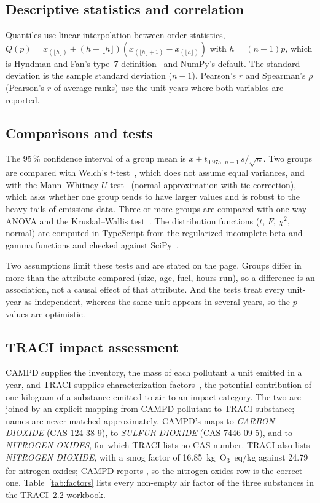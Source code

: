 \documentclass[11pt,a4paper]{article}
\begin{document}
\subsection{Descriptive statistics and correlation}

Quantiles use linear interpolation between order statistics, $Q(p) = x_{(\lfloor h\rfloor)} +
(h - \lfloor h\rfloor)(x_{(\lfloor h\rfloor + 1)} - x_{(\lfloor h\rfloor)})$ with $h = (n-1)p$,
which is Hyndman and Fan's type~7 definition~\cite{hyndman1996quantiles} and NumPy's default.
The standard deviation is the sample standard deviation ($n - 1$). Pearson's $r$ and Spearman's
$\rho$ (Pearson's $r$ of average ranks) use the unit-years where both variables are reported.

\subsection{Comparisons and tests}

The 95\,\% confidence interval of a group mean is $\bar{x} \pm t_{0.975,\,n-1}\, s/\sqrt{n}$.
Two groups are compared with Welch's $t$-test~\cite{welch1947}, which does not assume equal
variances, and with the Mann--Whitney $U$ test~\cite{mann1947} (normal approximation with tie
correction), which asks whether one group tends to have larger values and is robust to the
heavy tails of emissions data. Three or more groups are compared with one-way ANOVA and the
Kruskal--Wallis test~\cite{kruskal1952}. The distribution functions ($t$, $F$, $\chi^2$, normal)
are computed in TypeScript from the regularized incomplete beta and gamma functions and checked
against SciPy~\cite{virtanen2020scipy}.

Two assumptions limit these tests and are stated on the page. Groups differ in more than the
attribute compared (size, age, fuel, hours run), so a difference is an association, not a
causal effect of that attribute. And the tests treat every unit-year as independent, whereas
the same unit appears in several years, so the $p$-values are optimistic.

\subsection{TRACI impact assessment}
\label{sec:traci}

CAMPD supplies the inventory, the mass of each pollutant a unit emitted in a year, and TRACI
supplies characterization factors~\cite{bare2011traci,epa2022traci22}, the potential
contribution of one kilogram of a substance emitted to air to an impact category. The two are
joined by an explicit mapping from CAMPD pollutant to TRACI substance; names are never matched
approximately. CAMPD's \COtwo{} maps to \emph{CARBON DIOXIDE} (CAS 124-38-9), \SOtwo{} to
\emph{SULFUR DIOXIDE} (CAS 7446-09-5), and \NOx{} to \emph{NITROGEN OXIDES}, for which TRACI
lists no CAS number. TRACI also lists \emph{NITROGEN DIOXIDE}, with a smog factor of
16.85~kg~O\textsubscript{3}~eq/kg against 24.79 for nitrogen oxides; CAMPD reports \NOx{}, so the
nitrogen-oxides row is the correct one. Table~\ref{tab:factors} lists every non-empty air factor
of the three substances in the TRACI~2.2 workbook.
\end{document}
